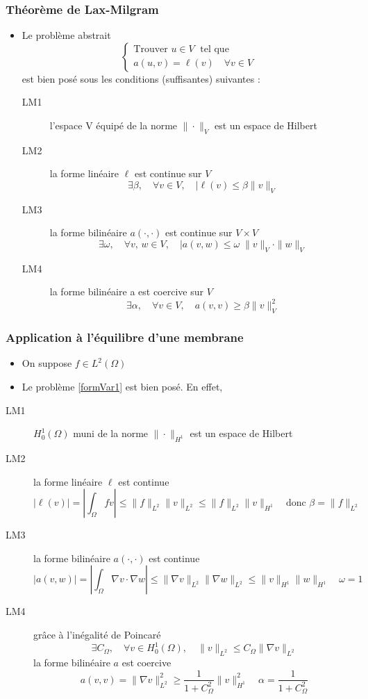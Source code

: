 \documentclass{beamer}
\begin{document}
\begin{frame}
\frametitle{Théorème de Lax-Milgram}
\begin{itemize}
\item Le problème abstrait
\begin{equation}
\left\{
\begin{array}{l}
\mbox{Trouver } u \in V\;\mbox{ tel que }\\
a(u,v)= \ell(v) \quad \forall v\in V
\end{array}
\right.
\label{probAbst1}
\end{equation}
est bien posé sous les conditions (suffisantes) suivantes :
\begin{description}
\item[LM1]  l'espace V équipé de la norme $\|\cdot\|_V$ est un espace de Hilbert
\item[LM2]  la forme linéaire $\ell$ est continue sur $V$
\[\exists\beta,\quad \forall v \in V,\quad |\ell(v)\leq \beta \|v\|_V\]
\item[LM3]  la forme bilinéaire $a(\cdot,\cdot)$ est continue sur $V \times V$
\[\exists \omega,\quad \forall v,\, w\in V,\quad |a(v,w)\leq \omega\; \|v\|_V \cdot \|w\|_V\]
\item[LM4] la forme bilinéaire a est coercive sur $V$
\[\exists\alpha,\quad \forall v \in V,\quad a(v,v)\geq \beta \|v\|^2_V\]
\end{description}

\end{itemize}
\end{frame}

\begin{frame}
\frametitle{Application à l'équilibre d'une membrane}
\begin{itemize}
\item On suppose $f\in L^2(\Omega)$
\item Le problème \eqref{formVar1} est bien posé. En effet,
\end{itemize}

\begin{description}
\item[LM1] $H^1_0(\Omega)$ muni de la norme $\|\cdot\|_{H^1}$ est un espace de Hilbert
\item[LM2] la forme linéaire $\ell$ est continue
\[ |\ell(v)|=\left|\int_{\Omega} f v\right|\leq \|f\|_{L^2} \|v\|_{L^2}\leq \|f\|_{L^2} \|v\|_{H^1}\quad\mbox{donc } \beta=\|f\|_{L^2}\]
\item[LM3] la forme bilinéaire $a(\cdot,\cdot)$ est continue
\[|a(v,w)|=\left|\int_{\Omega} \nabla v\cdot \nabla w\right|\leq \|\nabla v\|_{L^2} \|\nabla w\|_{L^2}\leq \|v\|_{H^1} \|w\|_{H^1}\quad \omega=1\]
\item[LM4] grâce à l'inégalité de Poincaré
\[\exists C_{\Omega},\quad \forall v\in H^1_0(\Omega),\quad \|v\|_{L^2}\leq C_{\Omega}\|\nabla v\|_{L^2}\]
la forme bilinéaire $a$ est coercive
\[a(v,v)=\|\nabla v\|^2_{L^2}\geq \frac{1}{1+C_{\Omega}^2}\|v\|^2_{H^1}\quad \alpha = \frac{1}{1+C_{\Omega}^2}\]
\end{description}

\end{frame}
\end{document}
